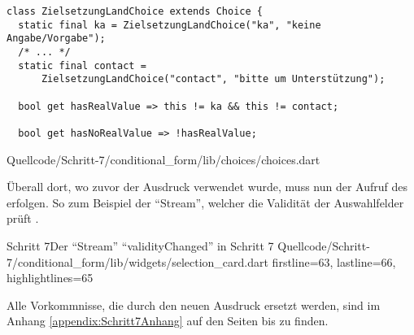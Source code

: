 \ifIncludeFigures
  \begin{listing}[htbp]
    \let\oldtheFancyVerbLine\theFancyVerbLine
    \renewcommand\theFancyVerbLine{%
      \ifnum\value{FancyVerbLine}=187
      \setcounter{FancyVerbLine}{197}
      \else
      \oldtheFancyVerbLine%
      \fi
    }
    \begin{verbatim}
class ZielsetzungLandChoice extends Choice {
  static final ka = ZielsetzungLandChoice("ka", "keine Angabe/Vorgabe");
  /* ... */
  static final contact =
      ZielsetzungLandChoice("contact", "bitte um Unterstützung");

  bool get hasRealValue => this != ka && this != contact;

  bool get hasNoRealValue => !hasRealValue;
\end{verbatim}
     {Quellcode/Schritt-7/conditional_form/lib/choices/choices.dart}
    \label{lst:Schritt7ZielsetzungLandChoice}
  \end{listing}
\fi







Überall dort, wo zuvor der Ausdruck  verwendet wurde, muss nun der Aufruf des  erfolgen.
So zum Beispiel der \enquote{Stream}, welcher die Validität der Auswahlfelder prüft \Lst{\ref{lst:Schritt7validityChangedchoiceMatcher}}.
\begin{alexlisting}{Schritt 7}{Der \enquote{Stream} \enquote{validityChanged} in Schritt 7}
  {Quellcode/Schritt-7/conditional_form/lib/widgets/selection_card.dart}
  {firstline=63, lastline=66, highlightlines={65}}
  \label{lst:Schritt7validityChangedchoiceMatcher}
  \end{alexlisting}

Alle Vorkommnisse, die durch den neuen Ausdruck ersetzt werden,
sind im Anhang \ref{appendix:Schritt7Anhang} auf den Seiten \pageref{lst:Schritt7validityChangedStreamBuilderChoiceMatcher}
bis \pageref{lst:Schritt7validateChoices} zu finden.
